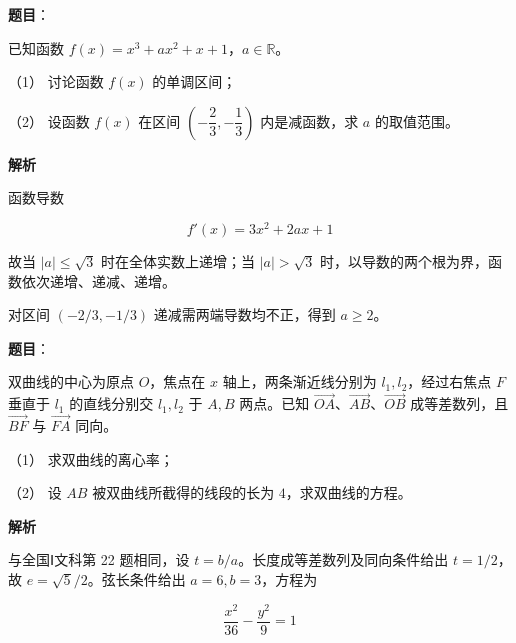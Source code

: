 \begin{answer}

\textbf{题目}：

已知函数 $f(x)=x^3+ax^2+x+1$，$a\in\mathbb R$。

（1） 讨论函数 $f(x)$ 的单调区间；

（2） 设函数 $f(x)$ 在区间 $\left(-\dfrac23,-\dfrac13\right)$ 内是减函数，求 $a$ 的取值范围。

\textbf{解析}


函数导数

\nopagebreak[4]
\[
f'(x)=3x^2+2ax+1
\]

故当 $|a|\leqslant\sqrt3$ 时在全体实数上递增；当 $|a|>\sqrt3$ 时，以导数的两个根为界，函数依次递增、递减、递增。


对区间 $(-2/3,-1/3)$ 递减需两端导数均不正，得到 $a\geqslant2$。



\end{answer}
\begin{answer}

\textbf{题目}：

双曲线的中心为原点 $O$，焦点在 $x$ 轴上，两条渐近线分别为 $l_1,l_2$，经过右焦点 $F$ 垂直于 $l_1$ 的直线分别交 $l_1,l_2$ 于 $A,B$ 两点。已知 $\overrightarrow{OA}$、$\overrightarrow{AB}$、$\overrightarrow{OB}$ 成等差数列，且 $\overrightarrow{BF}$ 与 $\overrightarrow{FA}$ 同向。

（1） 求双曲线的离心率；

（2） 设 $AB$ 被双曲线所截得的线段的长为 $4$，求双曲线的方程。

\textbf{解析}


与全国Ⅰ文科第 22 题相同，设 $t=b/a$。长度成等差数列及同向条件给出 $t=1/2$，故 $e=\sqrt5/2$。弦长条件给出 $a=6,b=3$，方程为


\nopagebreak[4]
\[
\frac{x^2}{36}-\frac{y^2}{9}=1
\]



\end{answer}
